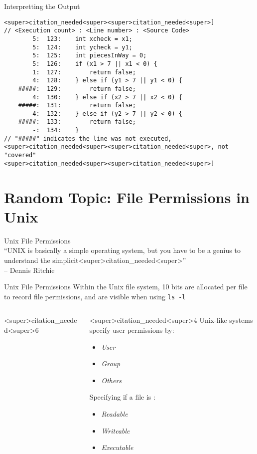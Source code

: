 \documentclass[11pt]{beamer}
\begin{document}
\begin{frame}[fragile=singleslide]{Interpretting the Output}
\footnotesize
\begin{lstlisting}[style=C]
<super>citation_needed<super><super>citation_needed<super>]
// <Execution count> : <Line number> : <Source Code>
        5:  123:	int xcheck = x1;
        5:  124:	int ycheck = y1;
        5:  125:	int piecesInWay = 0;
        5:  126:	if (x1 > 7 || x1 < 0) {
        1:  127:		return false;
        4:  128:	} else if (y1 > 7 || y1 < 0) {
    #####:  129:		return false;
        4:  130:	} else if (x2 > 7 || x2 < 0) {
    #####:  131:		return false;
        4:  132:	} else if (y2 > 7 || y2 < 0) {
    #####:  133:		return false;
        -:  134:	}
// "#####" indicates the line was not executed, <super>citation_needed<super><super>citation_needed<super>, not "covered"
<super>citation_needed<super><super>citation_needed<super>]
\end{lstlisting}

\end{frame}

\section[Permissions]{Random Topic: File Permissions in Unix}
\begin{frame}{Unix File Permissions}
\center
\ \\
``UNIX is basically a simple operating system, but you have to be a genius to understand the simplicit<super>citation_needed<super>''  \\ -- Dennis Ritchie
\end{frame}

\begin{frame}{Unix File Permissions}
Within the Unix file system, 10 bits are allocated per file to record file permissions, and are visible when using \texttt{ls -l}
\vspace{-1em}
\begin{columns}
\begin{column}{<super>citation_needed<super>6\textwidth}
\center
\
\end{column}
\begin{column}{<super>citation_needed<super>4\textwidth}
Unix-like systems specify user permissions by:
\begin{itemize}
\item \textit{User}
\item \textit{Group}
\item \textit{Others}
\end{itemize}
Specifying if a file is :
\begin{itemize}
\item \textit{Readable}
\item \textit{Writeable}
\item \textit{Executable}
\end{itemize}
\end{column}
\end{columns}
\end{frame}
\end{document}
